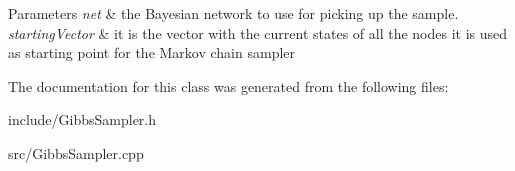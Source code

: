 \begin{DoxyParams}{Parameters}
{\em net} & the Bayesian network to use for picking up the sample. \\
\hline
{\em starting\-Vector} & it is the vector with the current states of all the nodes it is used as starting point for the Markov chain sampler \\
\hline
\end{DoxyParams}


The documentation for this class was generated from the following files\-:\begin{DoxyCompactItemize}
\item 
include/Gibbs\-Sampler.\-h\item 
src/Gibbs\-Sampler.\-cpp\end{DoxyCompactItemize}
